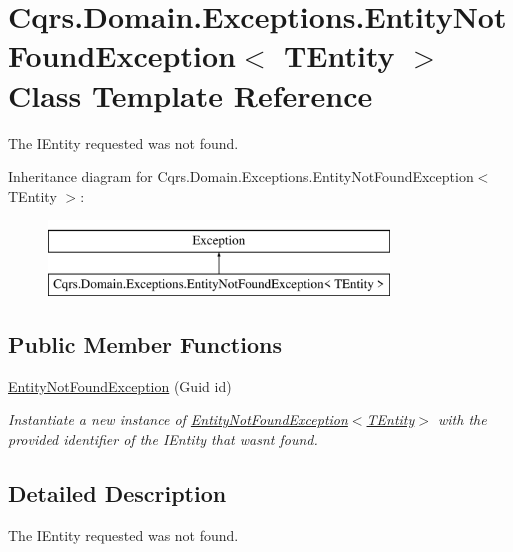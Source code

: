\hypertarget{classCqrs_1_1Domain_1_1Exceptions_1_1EntityNotFoundException}{}\section{Cqrs.\+Domain.\+Exceptions.\+Entity\+Not\+Found\+Exception$<$ T\+Entity $>$ Class Template Reference}
\label{classCqrs_1_1Domain_1_1Exceptions_1_1EntityNotFoundException}


The I\+Entity requested was not found.  


Inheritance diagram for Cqrs.\+Domain.\+Exceptions.\+Entity\+Not\+Found\+Exception$<$ T\+Entity $>$\+:\begin{figure}[H]
\begin{center}
\leavevmode
\includegraphics[height=2.000000cm]{classCqrs_1_1Domain_1_1Exceptions_1_1EntityNotFoundException}
\end{center}
\end{figure}
\subsection*{Public Member Functions}
\begin{DoxyCompactItemize}
\item 
\hyperlink{classCqrs_1_1Domain_1_1Exceptions_1_1EntityNotFoundException_ab62ed57aa319b92b5aebe6b34c69b177_ab62ed57aa319b92b5aebe6b34c69b177}{Entity\+Not\+Found\+Exception} (Guid id)
\begin{DoxyCompactList}\small\item\em Instantiate a new instance of \hyperlink{classCqrs_1_1Domain_1_1Exceptions_1_1EntityNotFoundException_ab62ed57aa319b92b5aebe6b34c69b177_ab62ed57aa319b92b5aebe6b34c69b177}{Entity\+Not\+Found\+Exception$<$\+T\+Entity$>$} with the provided identifier of the I\+Entity that wasn\textquotesingle{}t found. \end{DoxyCompactList}\end{DoxyCompactItemize}


\subsection{Detailed Description}
The I\+Entity requested was not found. 


